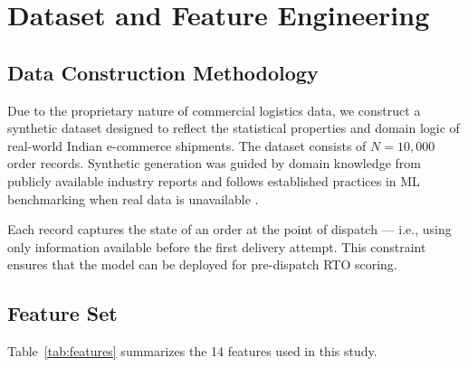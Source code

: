 \documentclass[conference]{IEEEtran}
\begin{document}
\section{Dataset and Feature Engineering}
\label{sec:data}

\subsection{Data Construction Methodology}

Due to the proprietary nature of commercial logistics data, we construct a synthetic dataset designed to reflect the statistical properties and domain logic of real-world Indian e-commerce shipments. The dataset consists of $N = 10{,}000$ order records. Synthetic generation was guided by domain knowledge from publicly available industry reports \cite{shiprocket2022, nasscom2023} and follows established practices in ML benchmarking when real data is unavailable \cite{jordon2022}.

Each record captures the state of an order at the point of dispatch — i.e., using only information available before the first delivery attempt. This constraint ensures that the model can be deployed for pre-dispatch RTO scoring.

\subsection{Feature Set}

Table~\ref{tab:features} summarizes the 14 features used in this study.
\end{document}
